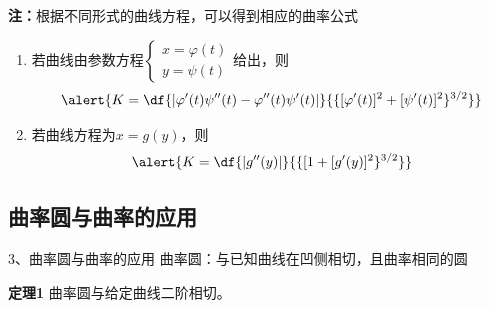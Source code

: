 \begin{frame}
	\linespread{1.2}
	\alert{{\bf 注：}根据不同形式的曲线方程，可以得到相应的曲率公式}\pause 
	\begin{enumerate}
	  \item 若曲线由参数方程$\left\{\begin{array}{l}
	  x=\varphi(t)\\ y=\psi(t)
	  \end{array}\right.$给出，\pause 则
	  $$\alert{K=\df{|\varphi'(t)\psi''(t)-\varphi''(t)\psi'(t)|}
		{\{[\varphi'(t)]^2+[\psi'(t)]^2\}^{3/2}}}$$\pause 
	  \item 若曲线方程为$x=g(y)$，\pause 则
		$$\alert{K=\df{|g''(y)|}{\{[1+[g'(y)]^2\}^{3/2}}}$$
	\end{enumerate}
\end{frame}

\subsection{曲率圆与曲率的应用}

\begin{frame}{3、曲率圆与曲率的应用}
	\linespread{1.2} \pause 
	{\bb 曲率圆：}与已知曲线在凹侧相切，且曲率相同的圆
	
	\pause\vspace{1ex}
	\begin{center}
	\end{center}
	\vspace{-1em}\pause 
	\begin{block}{\bf 定理1}
		曲率圆与给定曲线二阶相切。
	\end{block}
\end{frame}

